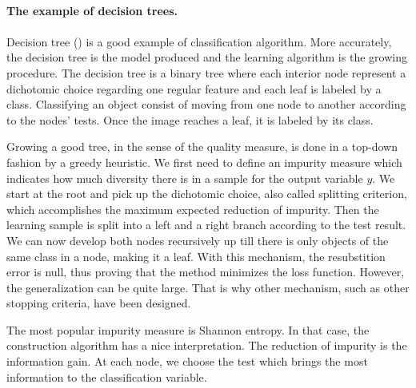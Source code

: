 \documentclass[a4paper]{report}
\newlength{\larg}
\begin{document}
\begin{leftbar}
	\paragraph{The example of decision trees.}
	\paragraph{}
	Decision tree (\cite{decisiontrees}) is a good example of classification algorithm. More accurately, the decision tree is the model produced and the learning algorithm is the growing procedure. The decision tree is a binary tree where each interior node represent a dichotomic choice regarding one regular feature and each leaf is labeled by a class. Classifying an object consist of moving from one node to another according to the nodes' tests. Once the image reaches a leaf, it is labeled by its class.
	\par
	Growing a good tree, in the sense of the quality measure, is done in a top-down fashion by a greedy heuristic. We first need to define an impurity measure which indicates how much diversity there is in a sample for the output variable $y$. We start at the root and pick up the dichotomic choice, also called splitting criterion, which accomplishes the maximum expected reduction of impurity. Then the learning sample is split into a left and a right branch according to the test result. We can now develop both nodes recursively up till there is only objects of the same class in a node, making it a leaf. With this mechanism, the resubstition error is null, thus proving that the method minimizes the loss function. However, the generalization can be quite large. That is why other mechanism, such as other stopping criteria, have been designed.
	\par
	The most popular impurity measure is Shannon entropy. In that case, the construction algorithm has a nice interpretation. The reduction of impurity is the information gain. At each node, we choose the test which brings the most information to the classification variable.
\end{leftbar}
\end{document}
